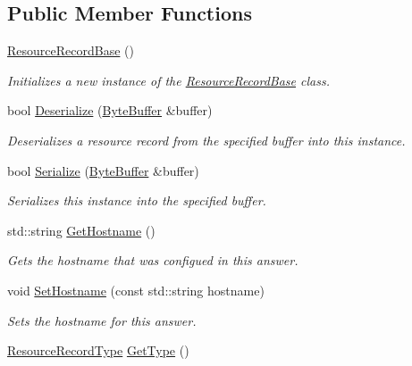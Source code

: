 \subsection*{Public Member Functions}
\begin{DoxyCompactItemize}
\item 
\hyperlink{class_senergy_1_1_dns_1_1_resource_record_base_add24f5a9168db8b1c3db85ae37715f4c}{Resource\-Record\-Base} ()
\begin{DoxyCompactList}\small\item\em Initializes a new instance of the \hyperlink{class_senergy_1_1_dns_1_1_resource_record_base}{Resource\-Record\-Base} class. \end{DoxyCompactList}\item 
bool \hyperlink{class_senergy_1_1_dns_1_1_resource_record_base_aee80193d3c782a3e3e69d78a1a27f205}{Deserialize} (\hyperlink{class_senergy_1_1_byte_buffer}{Byte\-Buffer} \&buffer)
\begin{DoxyCompactList}\small\item\em Deserializes a resource record from the specified buffer into this instance. \end{DoxyCompactList}\item 
bool \hyperlink{class_senergy_1_1_dns_1_1_resource_record_base_a3a343750cf6e6a4455d25c064d4412f5}{Serialize} (\hyperlink{class_senergy_1_1_byte_buffer}{Byte\-Buffer} \&buffer)
\begin{DoxyCompactList}\small\item\em Serializes this instance into the specified buffer. \end{DoxyCompactList}\item 
std\-::string \hyperlink{class_senergy_1_1_dns_1_1_resource_record_base_a486427180da21f76701001a5e411e369}{Get\-Hostname} ()
\begin{DoxyCompactList}\small\item\em Gets the hostname that was configued in this answer. \end{DoxyCompactList}\item 
void \hyperlink{class_senergy_1_1_dns_1_1_resource_record_base_ad5f8a096ae61dcf0ddaac380f84bf052}{Set\-Hostname} (const std\-::string hostname)
\begin{DoxyCompactList}\small\item\em Sets the hostname for this answer. \end{DoxyCompactList}\item 
\hyperlink{namespace_senergy_1_1_dns_a590bfd748c955364770f5ce358d9dfe0}{Resource\-Record\-Type} \hyperlink{class_senergy_1_1_dns_1_1_resource_record_base_acabfef62c1a3ef4332556bd312c42bdc}{Get\-Type} ()

\end{DoxyCompactItemize}
